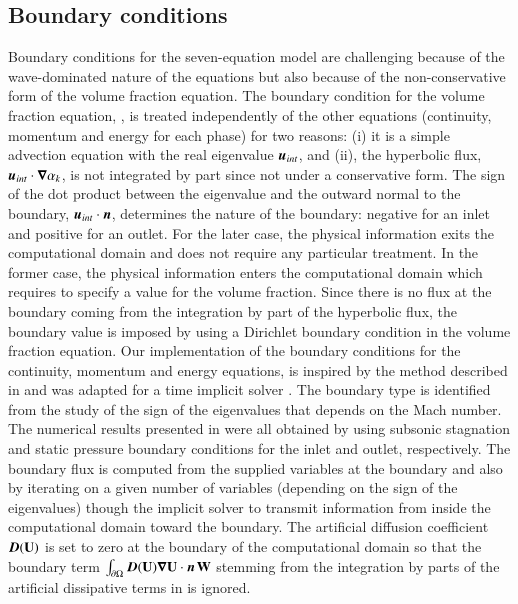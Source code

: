 \documentclass[preprint,10pt]{elsarticle}
\begin{document}
\subsection{Boundary conditions} \label{sec:bc}
%
Boundary conditions for the seven-equation model are challenging because of the wave-dominated nature of the equations but also because of the non-conservative form of the volume fraction equation. 
The boundary condition for the volume fraction equation, , is treated independently of the other equations (continuity, momentum and energy for each phase) for two reasons: (i) it is a simple advection equation with the real eigenvalue $\boldsymbol u_{int}$, and (ii), the hyperbolic flux, $\boldsymbol u_{int} \cdot \boldsymbol\nabla \alpha_k$, is not integrated by part since not under a conservative form. The sign of the dot product between the eigenvalue and the outward normal to the boundary, $\boldsymbol u_{int} \cdot \boldsymbol n$, determines the nature of the boundary: negative for an inlet and positive for an outlet. For the later case, the physical information exits the computational domain and does not require any particular treatment. In the former case, the physical information enters the computational domain which requires to specify a value for the volume fraction. Since there is no flux at the boundary coming from the integration by part of the hyperbolic flux, the boundary value is imposed by using a Dirichlet boundary condition in the volume fraction equation.   
Our implementation of the boundary conditions for the continuity, momentum and energy equations, is inspired by the method described in \cite{SEM} and was adapted for a time implicit solver \cite{Marco_dissertation}. The boundary type is identified from the study of the sign of the eigenvalues that depends on the Mach number. The numerical results presented in  were all obtained by using subsonic stagnation and static pressure boundary conditions for the inlet and outlet, respectively. The boundary flux is computed from the supplied variables at the boundary and also by iterating on a given number of variables (depending on the sign of the eigenvalues) though the implicit solver to transmit information from inside the computational domain toward the boundary. 
The artificial diffusion coefficient $\boldsymbol D(\mathbf  U)$ is set to zero at the boundary of the computational 
domain so that the boundary term 
$\int_{\partial \Omega} \boldsymbol D(\mathbf  U) \boldsymbol\nabla \mathbf  U \cdot \boldsymbol n \, \mathbf W$ stemming from the 
integration by parts of the artificial dissipative terms in  is ignored.
%
\end{document}
